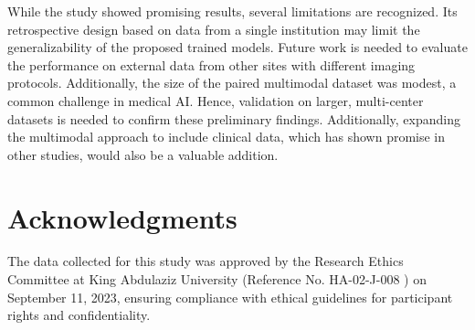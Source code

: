 \documentclass[12pt]{article}
\begin{document}
While the study showed promising results, several limitations are recognized. Its retrospective design based on data from a single institution may limit the generalizability of the proposed trained models. Future work is needed to evaluate the performance on external data from other sites with different imaging protocols. Additionally, the size of the paired multimodal dataset was modest, a common challenge in medical AI. Hence, validation on larger, multi-center datasets is needed to confirm these preliminary findings. Additionally, expanding the multimodal approach to include clinical data, which has shown promise in other studies, would also be a valuable addition.

\section*{Acknowledgments}

The data collected for this study was approved by the Research Ethics Committee at King Abdulaziz University (Reference No. HA-02-J-008 ) on September 11, 2023, ensuring compliance with ethical guidelines for participant rights and confidentiality.



\end{document}
